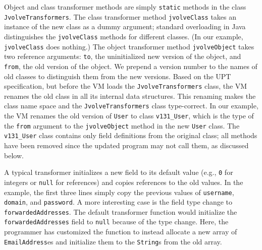 Object and class transformer methods are simply {\tt static}
methods in the class \texttt{JvolveTransformers}. 
The class transformer method
{\tt jvolveClass} takes an instance of the new class as a
dummy argument;  standard overloading in Java distinguishes
the {\tt jvolveClass} methods for different classes.  (In our example,
{\tt jvolveClass} does nothing.)  The
object transformer method {\tt jvolveObject} takes two reference
arguments: {\tt to}, the uninitialized new version of the object,
and {\tt from}, the old version of the object.  
We prepend a version number to the names of old classes to
distinguish them from the new versions. Based on the \ac{UPT} specification, but before the VM loads the \texttt{JvolveTransformers} class, the VM renames the old
class in all its internal data structures. This renaming makes the class name space and the \texttt{Jvolve\-Trans\-form\-ers} class type-correct.
In our example, the VM renames the old version of {\tt User} to
class {\tt v131\_User}, which is the type of the {\tt from}
argument to the {\tt jvolveObject} method in the new {\tt User}
class. The {\tt v131\_User} class contains only field definitions
from the original class; all methods have been removed since the updated
program may not call them, as discussed below.

A typical transformer initializes a new field to its default
value (e.g., {\tt 0} for integers or {\tt null} for references)
and copies references to the old values.  In the example, the first
three lines simply copy the previous values of {\tt username}, {\tt
domain}, and {\tt password}.
A more interesting case is the
field type change to {\tt forwardedAddresses}. %
The default transformer function would %
initialize the {\tt forwardedAddresses} field
to {\tt null} because of the type change.
Here, the programmer has customized the function to instead allocate a new array of {\tt EmailAddress}es
and initialize them to the {\tt String}s from the old array.  

